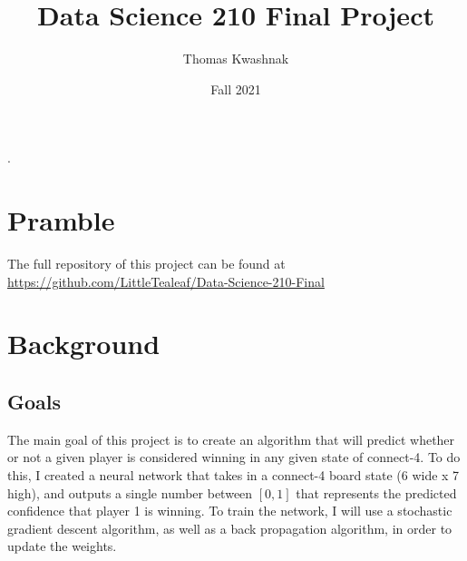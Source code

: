 \documentclass[10pt]{article}
\title{Data Science 210 Final Project}
\author{Thomas Kwashnak}
\date{Fall 2021}
\begin{document}
\maketitle
\setlength{\parindent}{0pt}.
\setlength{\parskip}{\baselineskip}
\lstset{numbers=left, numberstyle=\footnotesize, frame=l} 

\tableofcontents
\newpage

\section{Pramble}
The full repository of this project can be found at \url{https://github.com/LittleTealeaf/Data-Science-210-Final}

\section{Background}
\subsection{Goals}
The main goal of this project is to create an algorithm that will predict whether or not a given player is considered winning in any given state of connect-4. To do this, I created a neural network that takes in a connect-4 board state (6 wide x 7 high), and outputs a single number between $[0,1]$ that represents the predicted confidence that player 1 is winning. To train the network, I will use a stochastic gradient descent algorithm, as well as a back propagation algorithm, in order to update the weights.
\end{document}
